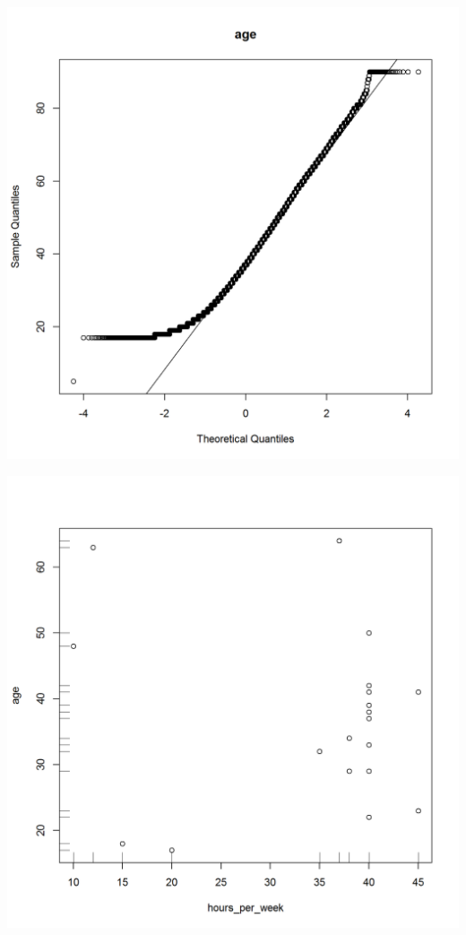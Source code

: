 \documentclass{article}\usepackage[]{graphicx}\usepackage[]{color}
\makeatletter
\def\maxwidth{ %
  \ifdim\Gin@nat@width>\linewidth
    \linewidth
  \else
    \Gin@nat@width
  \fi
}
\newenvironment{knitrout}{}{} %
\makeatother
\begin{document}
\begin{knitrout}
\color{fgcolor}
\includegraphics[width=\maxwidth]{figure/qqplot-1} 

\end{knitrout}

\begin{knitrout}
\color{fgcolor}
\includegraphics[width=\maxwidth]{figure/rug-1} 

\end{knitrout}
\end{document}
